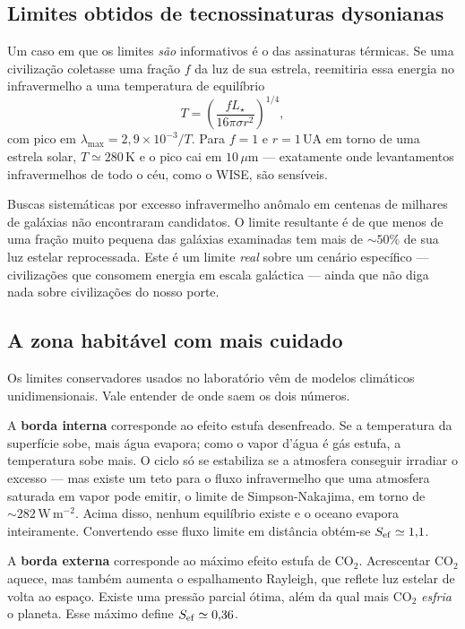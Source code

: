 \documentclass[11pt,a4paper]{article}
\begin{document}
\subsection*{Limites obtidos de tecnossinaturas dysonianas}

Um caso em que os limites \emph{são} informativos é o das assinaturas térmicas. Se uma civilização coletasse uma fração $f$ da luz de sua estrela, reemitiria essa energia no infravermelho a uma temperatura de equilíbrio
\[
T=\left(\frac{fL_\star}{16\pi\sigma r^{2}}\right)^{1/4},
\]
com pico em $\lambda_{\max}=2{,}9\times10^{-3}/T$. Para $f=1$ e $r=1\,\mathrm{UA}$ em torno de uma estrela solar, $T\simeq280\,\mathrm{K}$ e o pico cai em $10\,\mu\mathrm{m}$ --- exatamente onde levantamentos infravermelhos de todo o céu, como o WISE, são sensíveis.

Buscas sistemáticas por excesso infravermelho anômalo em centenas de milhares de galáxias não encontraram candidatos. O limite resultante é de que menos de uma fração muito pequena das galáxias examinadas tem mais de $\sim50\%$ de sua luz estelar reprocessada. Este é um limite \emph{real} sobre um cenário específico --- civilizações que consomem energia em escala galáctica --- ainda que não diga nada sobre civilizações do nosso porte.

\subsection*{A zona habitável com mais cuidado}

Os limites conservadores usados no laboratório vêm de modelos climáticos unidimensionais. Vale entender de onde saem os dois números.

A \textbf{borda interna} corresponde ao efeito estufa desenfreado. Se a temperatura da superfície sobe, mais água evapora; como o vapor d'água é gás estufa, a temperatura sobe mais. O ciclo só se estabiliza se a atmosfera conseguir irradiar o excesso --- mas existe um teto para o fluxo infravermelho que uma atmosfera saturada em vapor pode emitir, o limite de Simpson-Nakajima, em torno de $\sim282\,\mathrm{W\,m^{-2}}$. Acima disso, nenhum equilíbrio existe e o oceano evapora inteiramente. Convertendo esse fluxo limite em distância obtém-se $S_{\rm ef}\simeq1{,}1$.

A \textbf{borda externa} corresponde ao máximo efeito estufa de CO$_2$. Acrescentar CO$_2$ aquece, mas também aumenta o espalhamento Rayleigh, que reflete luz estelar de volta ao espaço. Existe uma pressão parcial ótima, além da qual mais CO$_2$ \emph{esfria} o planeta. Esse máximo define $S_{\rm ef}\simeq0{,}36$.
\end{document}

